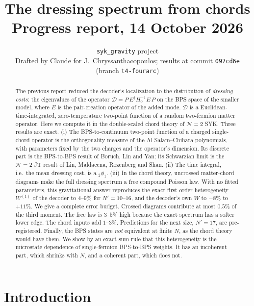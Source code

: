 \documentclass[11pt]{article}
\title{\bf The dressing spectrum from chords\\[6pt]\large Progress report, 14 October 2026}
\author{\texttt{syk\_gravity} project\\[2pt]\small Drafted by Claude for J.~Chryssanthacopoulos; results at commit
\texttt{097cd6e} (branch \texttt{t4-fourarc})}
\date{}
\newcommand{\Np}{N'}
\newcommand{\Dc}{\mathcal D}
\newcommand{\Wone}{W^{(1)}}
\theoremstyle{plain}
\theoremstyle{remark}
\numberwithin{equation}{section}
\begin{document}
\maketitle

\begin{abstract}
\noindent
The previous report reduced the decoder's localization to the distribution of \emph{dressing costs}: the eigenvalues
of the operator $\Dc=P\,E^\dagger H_0^{-1}E\,P$ on the BPS space of the smaller model, where $E$ is the pair-creation
operator of the added mode. $\Dc$ is a Euclidean-time-integrated, zero-temperature two-point function of a random
two-fermion matter operator. Here we compute it in the double-scaled chord theory of $\mathcal N=2$ SYK. Three results
are exact. (i) The BPS-to-continuum two-point function of a charged single-chord operator is the orthogonality measure
of the Al-Salam--Chihara polynomials, with parameters fixed by the two charges and the operator's dimension. Its
discrete part is the BPS-to-BPS result of Boruch, Lin and Yan; its Schwarzian limit is the $\mathcal N=2$ JT result of
Lin, Maldacena, Rozenberg and Shan. (ii) The time integral, i.e.\ the mean dressing cost, is a ${}_2\phi_1$. (iii) In
the chord theory, uncrossed matter-chord diagrams make the full dressing spectrum a free compound Poisson law. With no
fitted parameters, this gravitational answer reproduces the exact first-order heterogeneity $\Wone$ of the decoder to
$4$--$9\%$ for $\Np=10$--$16$, and the decoder's own $W$ to $-8\%$ to $+11\%$. We give a complete error budget.
Crossed diagrams contribute at most $0.5\%$ of the third moment. The free law is $3$--$5\%$ high because the exact
spectrum has a softer lower edge. The chord inputs add $1$--$3\%$. Predictions for the next size, $\Np=17$, are pre-registered.
Finally, the BPS states are \emph{not} equivalent at finite $N$, as the chord theory would have them. We show by an
exact sum rule that this heterogeneity is the microstate dependence of single-fermion BPS-to-BPS weights. It has an
incoherent part, which shrinks with $N$, and a coherent part, which does not.
\end{abstract}

\tableofcontents

\section{Introduction}\label{sec:intro}
\end{document}
